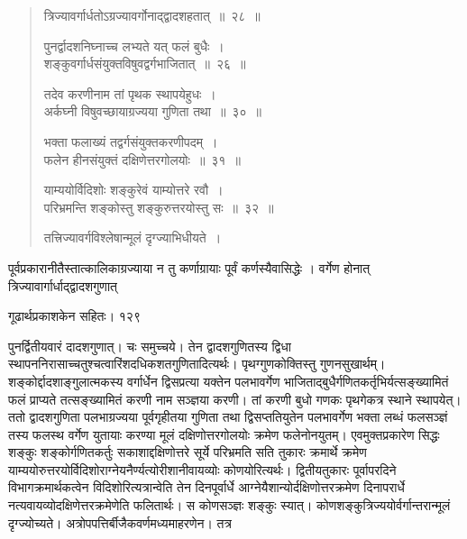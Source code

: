 \documentclass[11pt, openany]{book}
\begin{document}
\begin{quote}
 {\ssi त्रिज्यावर्गार्धतोऽग्रज्यावर्गोनाद्द्वादशहतात्~॥~२८~॥
 
 पुनर्द्वादशनिघ्नाच्च लभ्यते यत् फलं बुधैः~।\\
 शङ्कुवर्गार्धसंयुक्तविषुवद्वर्गभाजितात्~॥~२६~॥
 
 तदेव करणीनाम तां पृथक स्थापयेहुधः~।\\
 अर्कघ्नी विषुवच्छायाग्रज्यया गुणिता तथा~॥~३०~॥
 
 भक्ता फलाख्यं तद्वर्गसंयुक्तकरणीपदम्~।\\
 फलेन हीनसंयुक्तं दक्षिणेत्तरगोलयोः~॥~३१~॥
 
 याम्ययोर्विदिशोः शङ्कुरेवं याम्योत्तरे रवौ~।\\
 परिभ्रमन्ति शङ्कोस्तु शङ्कुरुत्तरयोस्तु सः~॥~३२~॥
 
 तत्त्रिज्यावर्गविश्लेषान्मूलं दृग्ज्याभिधीयते~।}
 \end{quote}
 
 पूर्वप्रकारानीतैस्तात्कालिकाग्रज्याया न तु कर्णाग्रायाः पूर्वं कर्णस्यैवासिद्धेः । वर्गेण होनात् त्रिज्यावार्गार्धाद्द्वादशगुणात्


\newpage


\hspace{3cm}गूढार्थप्रकाशकेन सहितः। \hfill १२९
\vspace{1cm}

\begin{sloppypar}
पुनर्द्वितीयवारं दादशगुणात्। चः समुच्चये। तेन द्वादशगुणितस्य द्विधा स्थापननिरासाच्चतुश्चत्वारिंशदधिकशतगुणितादित्यर्थः। पृथग्गुणकोक्तिस्तु गुणनसुखार्थम्। शङ्कोर्द्दादशाङ्गुलात्मकस्य वर्गार्धेन द्विसप्रत्या यक्तेन पलभावर्गेण भाजिताद्बुधैर्गणितकर्तृभिर्यत्सङ्ख्यामितं फलं प्राप्यते तत्सङ्ख्यामितं करणी नाम सञ्ज्ञया करणी। तां करणी बुधो गणकः पृथगेकत्र स्थाने स्थापयेत्। ततो द्वादशगुणिता पलभाग्रज्यया पूर्वगृहीतया गुणिता तथा द्विसप्ततियुतेन पलभावर्गेण भक्ता लब्धं फलसञ्ज्ञं तस्य फलस्थ वर्गेण युतायाः करण्या मूलं दक्षिणोत्तरगोलयोः क्रमेण फलेनोनयुतम्। एवमुक्तप्रकारेण सिद्धः शङ्कुः शङ्कोर्गणितकर्तुः सकाशाद्दक्षिणोत्तरे सूर्ये परिभ्रमति सति तुकारः क्रमार्थे क्रमेण याम्ययोरुत्तरयोर्विदिशोराग्नेयनैर्ण्यत्योरीशानीवायव्योः कोणयोरित्यर्थः। द्वितीयतुकारः पूर्वापरदिने विभागक्रमार्थकत्वेन विदिशोरित्यत्रान्वेति तेन दिनपूर्वार्धे आग्नेयैशान्योर्दक्षिणोत्तरक्रमेण दिनापरार्धे नत्यवायव्योदक्षिणेत्तरक्रमेणेति फलितार्थः। स कोणसञ्ज्ञः शङ्कुः स्यात्। कोणशङ्कुत्रिज्ययोर्वर्गान्तरान्मूलं दृग्ज्योच्यते। अत्रोपपत्तिर्बीजैकवर्णमध्यमाहरणेन। तत्र
\end{sloppypar}
\end{document}
